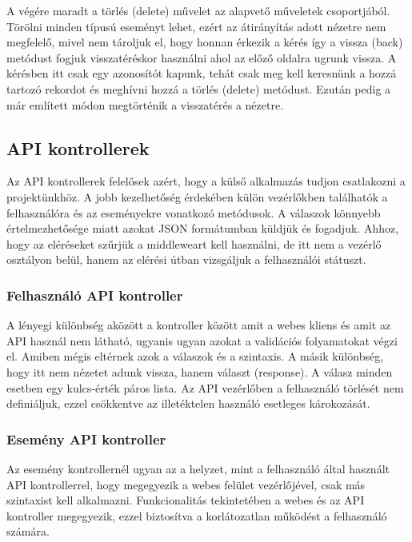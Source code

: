 \documentclass[
]{thesis-ekf}
\theoremstyle{definition}
\theoremstyle{remark}
\begin{document}
A végére maradt a törlés (delete) művelet az alapvető műveletek csoportjából. Törölni minden típusú eseményt lehet, ezért az átirányítás adott nézetre nem megfelelő, mivel nem tároljuk el, hogy honnan érkezik a kérés így a vissza (back) metódust fogjuk visszatéréskor használni ahol az előző oldalra ugrunk vissza. A kérésben itt csak egy azonosítót kapunk, tehát csak meg kell keresnünk a hozzá tartozó rekordot és meghívni hozzá a törlés (delete) metódust. Ezután pedig a már említett módon megtörténik a visszatérés a nézetre. 

\subsection{API kontrollerek}

Az API kontrollerek felelősek azért, hogy a külső alkalmazás tudjon csatlakozni a projektünkhöz. A jobb kezelhetőség érdekében külön vezérlőkben találhatók a felhasználóra és az eseményekre vonatkozó metódusok. A válaszok könnyebb értelmezhetősége miatt azokat JSON formátumban küldjük és fogadjuk. Ahhoz, hogy az eléréseket szűrjük a middleweart kell használni, de itt nem a vezérlő osztályon belül, hanem az elérési útban vizsgáljuk a felhasználói státuszt.

\subsubsection{Felhasználó API kontroller}

A lényegi különbség aközött a kontroller között amit a webes kliens és amit az API használ nem látható, ugyanis ugyan azokat a validációs folyamatokat végzi el. Amiben mégis eltérnek azok a válaszok és a szintaxis. A másik különbség, hogy itt nem nézetet adunk vissza, hanem választ (response). A válasz minden esetben egy kulcs-érték páros lista.
Az API vezérlőben a felhasználó törlését nem definiáljuk, ezzel csökkentve az illetéktelen használó esetleges károkozását. 

\subsubsection{Esemény API kontroller}

Az esemény kontrollernél ugyan az a helyzet, mint a felhasználó által használt API kontrollerrel, hogy megegyezik a webes felület vezérlőjével, csak más szintaxist kell alkalmazni. Funkcionalitás tekintetében a webes és az API kontroller megegyezik, ezzel biztosítva a korlátozatlan működést a felhasználó számára.
\end{document}
